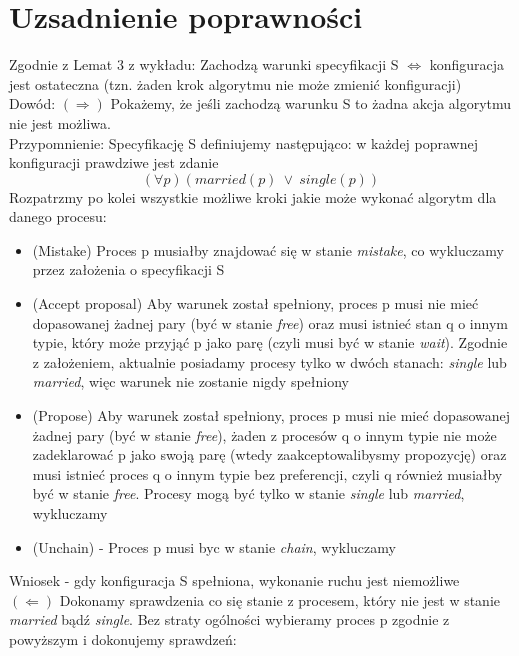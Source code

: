 \documentclass{article}
\begin{document}
\section{Uzsadnienie poprawności}
    Zgodnie z Lemat 3 z wykładu: Zachodzą warunki specyfikacji S $\iff$ konfiguracja
    jest ostateczna (tzn. żaden krok algorytmu nie może zmienić konfiguracji)\\
    Dowód: $(\Rightarrow)$ Pokażemy, że jeśli zachodzą warunku S to żadna akcja algorytmu nie jest możliwa. \\
    Przypomnienie: Specyfikację S definiujemy następująco: w każdej poprawnej
    konfiguracji prawdziwe jest zdanie
    \begin{equation}
        (\forall p) (married(p) \: \lor \: single(p))
    \end{equation}
    Rozpatrzmy po kolei wszystkie możliwe kroki jakie może wykonać algorytm dla danego procesu:
    \begin{itemize}
        \item (Mistake) Proces p musiałby znajdować się w stanie \textit{mistake}, co wykluczamy przez założenia o specyfikacji S
        \item (Accept proposal) Aby warunek został spełniony, proces p musi nie mieć 
        dopasowanej żadnej pary (być w stanie \textit{free}) oraz musi istnieć stan q o innym typie, który może przyjąć 
        p jako parę (czyli musi być w stanie \textit{wait}). Zgodnie z założeniem, aktualnie posiadamy 
        procesy tylko w dwóch stanach: \textit{single} lub \textit{married}, więc warunek nie zostanie nigdy spełniony
        \item (Propose) Aby warunek został spełniony, proces p musi nie mieć 
        dopasowanej żadnej pary (być w stanie \textit{free}), żaden z procesów q o innym typie nie może zadeklarować p
        jako swoją parę (wtedy zaakceptowalibysmy propozycję) oraz musi istnieć proces q o innym typie bez preferencji, czyli 
        q również musiałby być w stanie \textit{free}. Procesy mogą być tylko w stanie \textit{single} lub \textit{married}, wykluczamy
        \item (Unchain) - Proces p musi byc w stanie \textit{chain}, wykluczamy
    \end{itemize}
    Wniosek - gdy konfiguracja S spełniona, wykonanie ruchu jest niemożliwe \\
    $(\Leftarrow)$ Dokonamy sprawdzenia co się stanie z procesem, który nie 
    jest w stanie \textit{married} bądź \textit{single}. Bez straty ogólności 
    wybieramy proces p zgodnie z powyższym i dokonujemy sprawdzeń:
\end{document}
